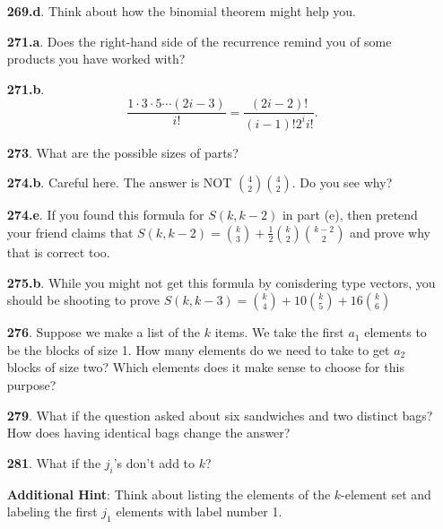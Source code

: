\documentclass[10pt,]{book}
\theoremstyle{plain}
\theoremstyle{definition}
\theoremstyle{definition}
\theoremstyle{definition}
\numberwithin{equation}{chapter}
\begin{document}
\begin{itemize}[itemsep=1em]
\item[\textbf{269.d}.]\hypertarget{p-1378}{}%
Think about how the binomial theorem might help you.%

\item[\textbf{271.a}.]\hypertarget{p-1386}{}%
Does the right-hand side of the recurrence remind you of some products you have worked with?%

\item[\textbf{271.b}.]\hypertarget{p-1389}{}%
%
\begin{equation*}
\frac{1\cdot 3\cdot 5\cdots (2i-3)}{i!} = \frac{(2i-2)!}{(i-1)!2^i i!}\text{.}
\end{equation*}
%

\item[\textbf{273}.]\hypertarget{p-1398}{}%
What are the possible sizes of parts?%

\item[\textbf{274.b}.]\hypertarget{p-1404}{}%
Careful here.  The answer is NOT \(\binom{4}{2}\binom{4}{2}\).  Do you see why?%

\item[\textbf{274.e}.]\hypertarget{p-1408}{}%
If you found this formula for \(S(k,k-2)\) in part (e), then pretend your friend claims that \(S(k, k-2) = \binom{k}{3} + \frac{1}{2}\binom{k}{2}\binom{k-2}{2}\) and prove why that is correct too.%

\item[\textbf{275.b}.]\hypertarget{p-1412}{}%
While you might not get this formula by conisdering type vectors, you should be shooting to prove \(S(k, k-3) = \binom{k}{4} + 10 \binom{k}{5} + 16 \binom{k}{6}\)%

\item[\textbf{276}.]\hypertarget{p-1414}{}%
Suppose we make a list of the \(k\) items. We take the first \(a_1\) elements to be the blocks of size 1. How many elements do we need to take to get \(a_2\) blocks of size two? Which elements does it make sense to choose for this purpose?%

\item[\textbf{279}.]\hypertarget{p-1421}{}%
What if the question asked about six sandwiches and two distinct bags? How does having identical bags change the answer?%

\item[\textbf{281}.]\hypertarget{p-1428}{}%
What if the \(j_i\)'s don't add to \(k\)?%

\par\smallskip
\noindent\textbf{Additional Hint}: \hypertarget{p-1429}{}%
Think about listing the elements of the \(k\)-element set and labeling the first \(j_1\) elements with label number 1.%


\end{itemize}
\end{document}
